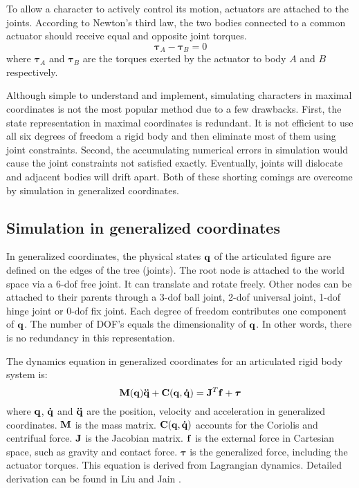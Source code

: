 To allow a character to actively control its motion, actuators are attached to the joints. According to Newton's third law, the two bodies connected to a common actuator should receive equal and opposite joint torques.
\begin{equation}
\boldsymbol{\tau}_A-\boldsymbol{\tau}_B=0
\label{eq:actuatorConstraint}
\end{equation}
where $\boldsymbol{\tau}_A$ and $\boldsymbol{\tau}_B$ are the torques exerted by the actuator to body $A$ and $B$ respectively.

Although simple to understand and implement, simulating characters in maximal coordinates is not the most popular method due to a few drawbacks. First, the state representation in  maximal coordinates is redundant. It is not efficient to use all six degrees of freedom a rigid body and then eliminate most of them using joint constraints. Second, the accumulating numerical errors in simulation would cause the joint constraints not satisfied exactly. Eventually, joints will dislocate and adjacent bodies will drift apart. Both of these shorting comings are overcome by simulation in generalized coordinates.

\subsection{Simulation in generalized coordinates}
In generalized coordinates, the physical states $\mathbf{q}$ of the articulated figure are defined on the edges of the tree (joints). The root node is attached to the world space via a 6-dof free joint. It can translate and rotate freely. Other nodes can be attached to their parents through a 3-dof ball joint, 2-dof universal joint, 1-dof hinge joint or 0-dof fix joint. Each degree of freedom contributes one component of $\mathbf{q}$. The number of DOF's equals the dimensionality of $\mathbf{q}$. In other words, there is no redundancy in this representation.

The dynamics equation in generalized coordinates for an articulated rigid body system is:
\begin{equation}
  \mathbf{M}(\mathbf{q})\mathbf{\ddot{q}}+\mathbf{C(q,\dot{q})}=\mathbf{J}^T\mathbf{f}+\boldsymbol{\tau}
\end{equation}
where $\mathbf{q}$, $\mathbf{\dot{q}}$ and $\mathbf{\ddot{q}}$ are the position, velocity and acceleration in generalized coordinates. $\mathbf{M}$ is the mass matrix. $\mathbf{C(q,\dot{q})}$ accounts for the Coriolis and centrifual force. $\mathbf{J}$ is the Jacobian matrix. $\mathbf{f}$ is the external force in Cartesian space, such as gravity and contact force. $\boldsymbol{\tau}$ is the generalized force, including the actuator torques. This equation is derived from Lagrangian dynamics. Detailed derivation can be found in Liu and Jain \cite{}.

